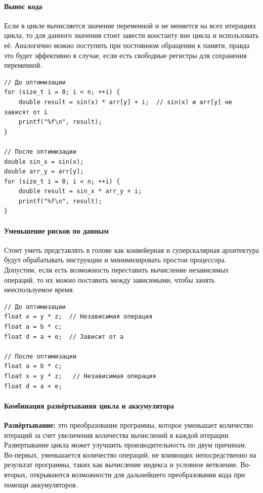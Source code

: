 \documentclass[12pt,a4paper]{article}
\begin{document}
\paragraph{Вынос кода}

Если в цикле вычисляется значение переменной и не меняется на всех итерациях цикла, то для данного значения стоит завести константу вне цикла и использовать её. Аналогично можно поступить при постоянном обращении к памяти, правда это будет эффективно в случае, если есть свободные регистры для сохранения переменной.

\newpage

\begin{verbatim}
// До оптимизации
for (size_t i = 0; i < n; ++i) {
    double result = sin(x) * arr[y] + i;  // sin(x) и arr[y] не зависят от i
    printf("%f\n", result);
}

// После оптимизации
double sin_x = sin(x);
double arr_y = arr[y];
for (size_t i = 0; i < n; ++i) {
    double result = sin_x * arr_y + i;
    printf("%f\n", result);
}
\end{verbatim}

\paragraph{Уменьшение рисков по данным}

Стоит уметь представлять в голове как конвейерная и суперскалярная архитектура будут обрабатывать инструкции и минимизировать простои процессора. Допустим, если есть возможность переставить вычисление независимых операций, то их можно поставить между зависимыми, чтобы занять неиспользуемое время.

\begin{verbatim}
// До оптимизации
float x = y * z;  // Независимая операция
float a = b * c;
float d = a + e;  // Зависит от a

// После оптимизации
float a = b * c;
float x = y * z;   // Независимая операция
float d = a + e;
\end{verbatim}

\paragraph{Комбинация развёртывания цикла и аккумулятора}
\indent

\textbf{Развёртывание: } это преобразование программы, которое уменьшает количество итераций за счет увеличения количества вычислений в каж­дой итерации. Развертывание цикла может улучшить производительность по двум причинам. Во-первых, уменьшается количество операций, не влияющих непосредственно на результат программы, таких как вычисление индекса и условное ветвление. Во-вторых, открываются возможности для дальнейшего преобразования кода при помощи аккумуляторов.
\end{document}
